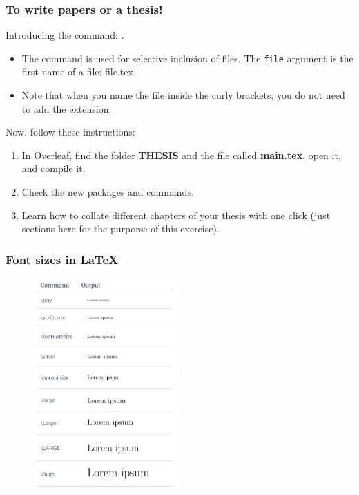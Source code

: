 \documentclass{beamer}
\begin{document}
\begin{frame}[fragile]
\frametitle{To write papers or a thesis!}
Introducing the command: \color{blue}{\verb||}\color{black}{}. \\
\begin{itemize}
\item The \color{blue}{\verb||}\color{black}{} command is used for selective inclusion of files. The \verb|file| argument is the first name of a file: file.tex.\\
\item Note that when you name the file inside the curly brackets, you do not need to add the extension. \\
\end{itemize}
\pause
Now, follow these instructions:
\begin{enumerate}
\item In Overleaf, find the folder \textbf{THESIS} and the file called \textbf{main.tex}, open it, and compile it. \\
\item Check the new packages and commands. \\
\item Learn how to collate different chapters of your thesis with one click (just sections here for the purporse of this exercise). \\
\end{enumerate}
\end{frame}


\begin{frame}[fragile]
\frametitle{Font sizes in \LaTeX}
\begin{figure}
\includegraphics[width=56mm]{figures/Fonts.png}
\end{figure}
\end{frame}
\end{document}
